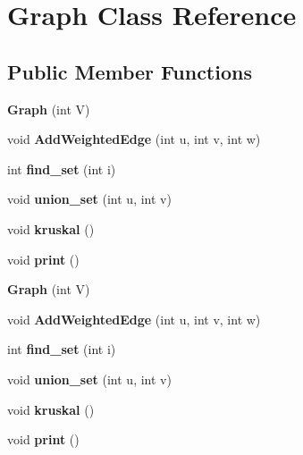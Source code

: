 \hypertarget{class_graph}{}\section{Graph Class Reference}
\label{class_graph}
\subsection*{Public Member Functions}
\begin{DoxyCompactItemize}
\item 
\mbox{\label{class_graph_af3ff6b295df8bf3bee0bafd7c7d56915}} 
{\bfseries Graph} (int V)
\item 
\mbox{\label{class_graph_a6e0b786e5023445457b8c742f5f15cf2}} 
void {\bfseries Add\+Weighted\+Edge} (int u, int v, int w)
\item 
\mbox{\label{class_graph_a7d345850bf222bc15f9d2a364d628bf7}} 
int {\bfseries find\+\_\+set} (int i)
\item 
\mbox{\label{class_graph_ac17601621203f1782504e6c6e3bf612a}} 
void {\bfseries union\+\_\+set} (int u, int v)
\item 
\mbox{\label{class_graph_a1de36bcb031663da79fc00f5aa0eaede}} 
void {\bfseries kruskal} ()
\item 
\mbox{\label{class_graph_a2ecf3dd3c4897aa924da8e5c221a8509}} 
void {\bfseries print} ()
\item 
\mbox{\label{class_graph_af3ff6b295df8bf3bee0bafd7c7d56915}} 
{\bfseries Graph} (int V)
\item 
\mbox{\label{class_graph_a6e0b786e5023445457b8c742f5f15cf2}} 
void {\bfseries Add\+Weighted\+Edge} (int u, int v, int w)
\item 
\mbox{\label{class_graph_a7d345850bf222bc15f9d2a364d628bf7}} 
int {\bfseries find\+\_\+set} (int i)
\item 
\mbox{\label{class_graph_ac17601621203f1782504e6c6e3bf612a}} 
void {\bfseries union\+\_\+set} (int u, int v)
\item 
\mbox{\label{class_graph_a1de36bcb031663da79fc00f5aa0eaede}} 
void {\bfseries kruskal} ()
\item 
\mbox{\label{class_graph_a2ecf3dd3c4897aa924da8e5c221a8509}} 
void {\bfseries print} ()
\end{DoxyCompactItemize}



